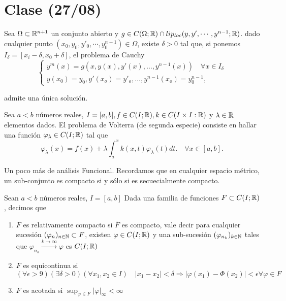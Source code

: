 \section{Clase (27/08)}

\begin{theorem} 
  Sea $\Omega \subset \mathbb{R}^{n+1}$ un conjunto abierto y $g \in C(\Omega;\mathbb{R})\cap lip_{loc}(y,y',\cdots, y^{n-1};\mathbb{R})$. dado cualquier punto $(x_0,y_0,y'_0,\cdots,y_0^{n-1})\in \Omega$, existe $\delta > 0$ tal que, si ponemos $I_{\delta}=[x_i -\delta, x_0+ \delta]$, el problema de Cauchy
  \[
    \begin{cases}
      y^{m}(x)=g(x,y(x),y'(x),\ldots,y^{n-1}(x)) \quad \forall x \in I_{\delta} \\
      y(x_0)=y_0, y'(x_o)=y'_o,\ldots, y^{n-1}(x_o)=y_0^{n-1},
    \end{cases}
  \]
       
  admite una única solución.
\end{theorem}

\begin{eg} 
    Sea $a<b$ números reales, $I=[a,b], f\in C(I;\mathbb{R}), k\in C(I\times I:\mathbb{R})$ y $\lambda \in \mathbb{R}$ elementos dados. El problema de Volterra (de segunda especie) consiste en hallar una función $\varphi_{\lambda}\in C(I;\mathbb{R})$ tal que 
  \[
    \varphi_{\lambda}(x)=f(x)+\lambda\int_{a}^{x}k(x,t)\varphi_{\lambda}(t)dt.\quad \forall x \in [a,b].
  \]
\end{eg}

Un poco más de análisis Funcional.
Recordamos que en cualquier espacio métrico, un sub-conjunto es compacto si y sólo si es secuecialmente compacto.

\begin{definition}
  Sean $a<b$ números reales, $I=[a,b]$ Dada una familia de funciones $  F\subset C(I;\mathbb{R})$, decimos que
  \begin{enumerate}
	  \item $F$ es relativamente compacto si $\overline{F}$ es compacto, vale decir para cualquier sucesión $(\varphi_n)_{n\in \mathbb{N}} \subset F$, existen $\varphi \in C(I;\mathbb{R})$ y una sub-sucesión $(\varphi_{n_k})_{k\in \mathbb{N}}$ tales que $\varphi_{n_k} \xrightarrow{k\to \infty}\varphi$ es $C(I;\mathbb{R})$
	  \item $F$ es equicontinua si $(\forall \epsilon >9)(\exists \delta > 0)(\forall x_1,x_2 \in I) \quad |x_1-x_2|<\delta \Rightarrow |\varphi(x_1)-\Phi(x_2)|<\epsilon \forall \varphi \in F$ 
	  \item $F$ es acotada si $\sup_{\varphi \in F}|\varphi|_{\infty} < \infty $ 
  \end{enumerate}
\end{definition}

